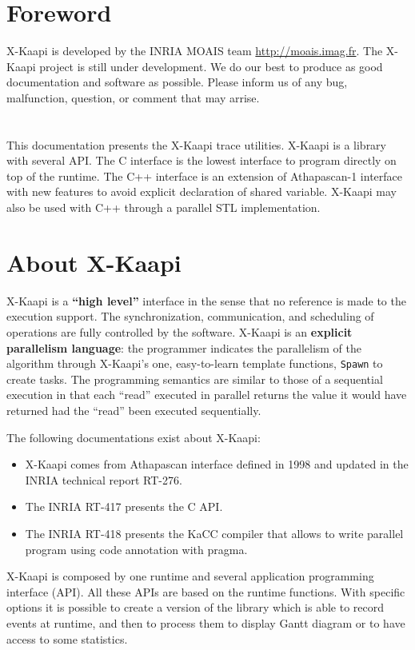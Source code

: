 \documentclass{article}[12pt]
\newcommand{\kaapi}{\textsc{X}-Kaapi\xspace}
\begin{document}
\RRtitle{\kaapi Tracing Tool}
\RRabstract{}
\RRresume{}
\RRmotcle{}
\RRkeyword{}
\RCGrenoble
\RRNo{}

\makeRT %

\newpage
\tableofcontents
\newpage

\section*{Foreword}

\kaapi is developed by the INRIA MOAIS team \url{http://moais.imag.fr}.
The \kaapi project is still under development.  We do our best to produce as
good documentation and  software as possible.  
Please inform us of any bug, malfunction, question, or comment that may
arrise. \\ 
~\\
~\\
This documentation presents the \kaapi trace utilities. \kaapi is a library with several API. 
The C interface is the lowest interface to program directly on top of the
runtime. The C++ interface is an extension of Athapascan-1 interface with new
features to avoid explicit declaration of shared variable.
\kaapi may also be used with C++ through a parallel STL implementation.

\newpage

\section*{About \kaapi}

\kaapi  is a \textbf{``high level''}  interface in the sense that no reference is made to the execution support.  
The synchronization, communication, and scheduling of operations are fully controlled by the software. 
   \kaapi is an  \textbf{explicit parallelism language}: the programmer indicates the parallelism of the algorithm through \kaapi's one, easy-to-learn  template functions, \texttt{Spawn} to create tasks.   The programming semantics are similar to those of a sequential 
 execution in that each ``read'' executed in parallel returns the value it would have returned had the ``read'' been executed  sequentially. 
 
The following documentations exist about \kaapi:
\begin{itemize}
\item \kaapi comes from Athapascan interface defined in 1998 and updated in the INRIA technical report RT-276. 
\item The INRIA RT-417 presents the C API.
\item The INRIA RT-418 presents the KaCC compiler that allows to write parallel program using code annotation with pragma.
\end{itemize}
\kaapi is composed by one runtime and several application programming interface (API).
All these APIs are based on the runtime functions. With specific options it is possible to create a version of the library which is able to record events at runtime, and then to process them to display Gantt diagram or to have access to some statistics.
\end{document}
